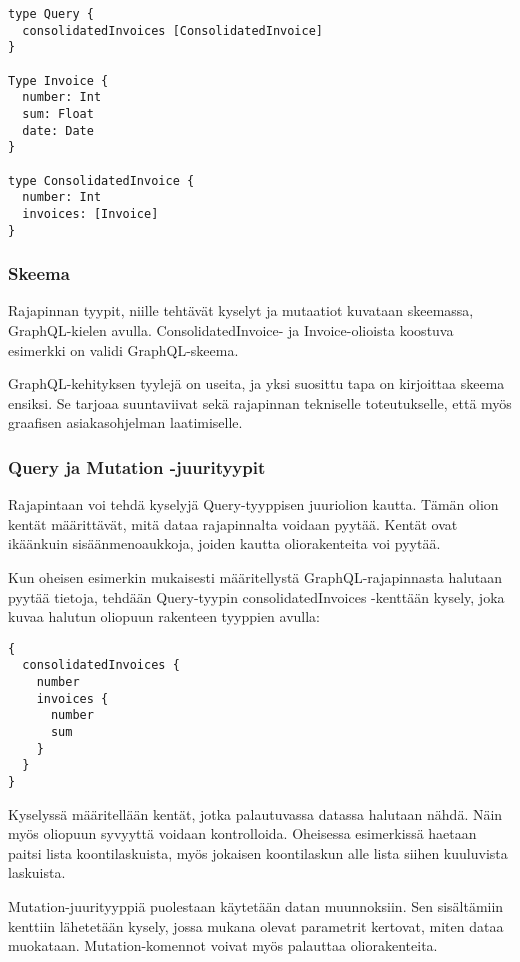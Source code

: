 \begin{verbatim}
type Query {
  consolidatedInvoices [ConsolidatedInvoice]
}

Type Invoice {
  number: Int
  sum: Float
  date: Date
}

type ConsolidatedInvoice {
  number: Int
  invoices: [Invoice]
}
\end{verbatim}

\hypertarget{skeema}{%
\subsubsection{Skeema}\label{skeema}}

Rajapinnan tyypit, niille tehtävät kyselyt ja mutaatiot kuvataan
skeemassa, GraphQL-kielen avulla. ConsolidatedInvoice- ja
Invoice-olioista koostuva esimerkki on validi GraphQL-skeema.

GraphQL-kehityksen tyylejä on useita, ja yksi suosittu tapa on
kirjoittaa skeema ensiksi. Se tarjoaa suuntaviivat sekä rajapinnan
tekniselle toteutukselle, että myös graafisen asiakasohjelman
laatimiselle.

\hypertarget{query-ja-mutation--juurityypit}{%
\subsubsection{Query ja Mutation
-juurityypit}\label{query-ja-mutation--juurityypit}}

Rajapintaan voi tehdä kyselyjä Query-tyyppisen juuriolion kautta. Tämän
olion kentät määrittävät, mitä dataa rajapinnalta voidaan pyytää. Kentät
ovat ikäänkuin sisäänmenoaukkoja, joiden kautta oliorakenteita voi
pyytää.

Kun oheisen esimerkin mukaisesti määritellystä GraphQL-rajapinnasta
halutaan pyytää tietoja, tehdään Query-tyypin consolidatedInvoices
-kenttään kysely, joka kuvaa halutun oliopuun rakenteen tyyppien avulla:

\begin{verbatim}
{
  consolidatedInvoices {
    number
    invoices {
      number
      sum
    }
  }
}
\end{verbatim}

Kyselyssä määritellään kentät, jotka palautuvassa datassa halutaan
nähdä. Näin myös oliopuun syvyyttä voidaan kontrolloida. Oheisessa
esimerkissä haetaan paitsi lista koontilaskuista, myös jokaisen
koontilaskun alle lista siihen kuuluvista laskuista.

Mutation-juurityyppiä puolestaan käytetään datan muunnoksiin. Sen
sisältämiin kenttiin lähetetään kysely, jossa mukana olevat parametrit
kertovat, miten dataa muokataan. Mutation-komennot voivat myös palauttaa
oliorakenteita.
